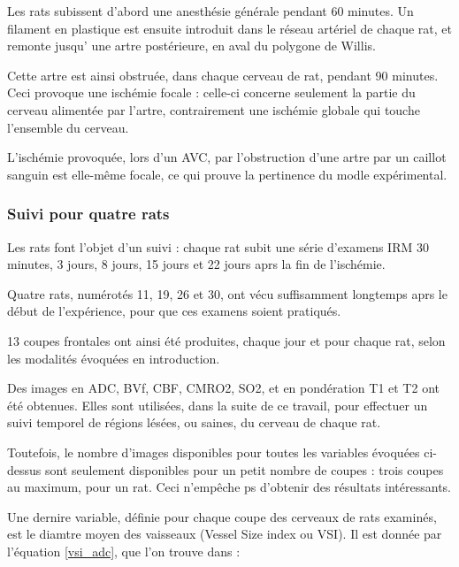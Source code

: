 \par
Les rats subissent d'abord une anesth\'esie g\'en\'erale pendant 60 minutes. %
Un filament en plastique est ensuite introduit dans le r\'eseau art\'eriel de chaque rat, %
et remonte jusqu' une artre post\'erieure, en aval du polygone de Willis.

\par
Cette artre est ainsi obstru\'ee, dans chaque cerveau de rat, pendant 90 minutes. %
Ceci provoque une isch\'emie focale : celle-ci concerne seulement la partie du cerveau aliment\'ee par l'artre, %
contrairement  une isch\'emie globale qui touche l'ensemble du cerveau.

\par
L'isch\'emie provoqu\'ee, lors d'un AVC, par l'obstruction d'une artre par un caillot sanguin est elle-m\^eme focale, %
ce qui prouve la pertinence du modle exp\'erimental.


\subsubsection{Suivi pour quatre rats}

Les rats font l'objet d'un suivi : chaque rat subit une s\'erie d'examens IRM 30 minutes, 3 jours, 8 jours, 15 jours et 22 jours aprs la fin de l'isch\'emie.

\par
Quatre rats, num\'erot\'es 11, 19, 26 et 30, ont v\'ecu suffisamment longtemps aprs le d\'ebut de l'exp\'erience, %
pour que ces examens soient pratiqu\'es.

\par
13 coupes frontales ont ainsi \'et\'e produites, chaque jour et pour chaque rat, %
selon les modalit\'es \'evoqu\'ees en introduction.

\par
Des images en ADC, BVf, CBF, CMRO2, SO2, et en pond\'eration T1 et T2 ont \'et\'e obtenues. %
Elles sont utilis\'ees, dans la suite de ce travail, pour effectuer un suivi temporel de r\'egions l\'es\'ees, ou saines, %
du cerveau de chaque rat.

\par
Toutefois, le nombre d'images disponibles pour toutes les variables \'evoqu\'ees ci-dessus sont seulement disponibles pour un petit nombre de coupes : %
trois coupes au maximum, pour un rat. Ceci n'emp\^eche ps d'obtenir des r\'esultats int\'eressants.

\etoile
Une dernire variable, d\'efinie pour chaque coupe des cerveaux de rats examin\'es, est le diamtre moyen des vaisseaux (Vessel Size index ou VSI). %
Il est donn\'ee par l'\'equation \ref{vsi_adc}, que l'on trouve dans \cite{Lem_PHD_10} :

